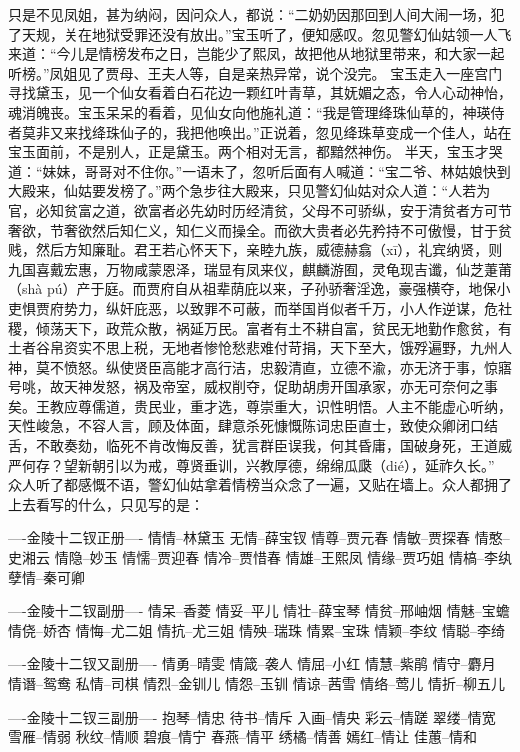 \documentclass[12pt,oneside]{book}
\begin{document}
只是不见凤姐，甚为纳闷，因问众人，都说：“二奶奶因那回到人间大闹一场，犯了天规，关在地狱受罪还没有放出。”宝玉听了，便知感叹。忽见警幻仙姑领一人飞来道：“今儿是情榜发布之日，岂能少了熙凤，故把他从地狱里带来，和大家一起听榜。”凤姐见了贾母、王夫人等，自是亲热异常，说个没完。
宝玉走入一座宫门寻找黛玉，见一个仙女看着白石花边一颗红叶青草，其妩媚之态，令人心动神怡，魂消魄丧。宝玉呆呆的看着，见仙女向他施礼道：“我是管理绛珠仙草的，神瑛侍者莫非又来找绛珠仙子的，我把他唤出。”正说着，忽见绛珠草变成一个佳人，站在宝玉面前，不是别人，正是黛玉。两个相对无言，都黯然神伤。
半天，宝玉才哭道：“妹妹，哥哥对不住你。”一语未了，忽听后面有人喊道：“宝二爷、林姑娘快到大殿来，仙姑要发榜了。”两个急步往大殿来，只见警幻仙姑对众人道：“人若为官，必知贫富之道，欲富者必先幼时历经清贫，父母不可骄纵，安于清贫者方可节奢欲，节奢欲然后知仁义，知仁义而操全。而欲大贵者必先矜持不可傲慢，甘于贫贱，然后方知廉耻。君王若心怀天下，亲睦九族，威德赫翕（xī），礼宾纳贤，则九国喜戴宏惠，万物咸蒙恩泽，瑞显有凤来仪，麒麟游囿，灵龟现吉谶，仙芝萐莆（shà pú）产于庭。而贾府自从祖辈荫庇以来，子孙骄奢淫逸，豪强横夺，地保小吏惧贾府势力，纵奸庇恶，以致罪不可蔽，而举国肖似者千万，小人作逆谋，危社稷，倾荡天下，政荒众散，祸延万民。富者有土不耕自富，贫民无地勤作愈贫，有土者谷帛资实不思上税，无地者惨怆愁悲难付苛捐，天下至大，饿殍遍野，九州人神，莫不愤怒。纵使贤臣高能才高行洁，忠毅清直，立德不渝，亦无济于事，惊寤号咷，故天神发怒，祸及帝室，威权削夺，促助胡虏开国承家，亦无可奈何之事矣。王教应尊儒道，贵民业，重才选，尊崇重大，识性明悟。人主不能虚心听纳，天性峻急，不容人言，顾及体面，肆意杀死慷慨陈词忠臣直士，致使众卿闭口结舌，不敢奏劾，临死不肯改悔反善，犹言群臣误我，何其昏庸，国破身死，王道威严何存？望新朝引以为戒，尊贤垂训，兴教厚德，绵绵瓜瓞（dié），延祚久长。”
众人听了都感慨不语，警幻仙姑拿着情榜当众念了一遍，又贴在墙上。众人都拥了上去看写的什么，只见写的是：

----金陵十二钗正册----
情情--林黛玉 无情--薛宝钗 情尊--贾元春 情敏--贾探春 情憨--史湘云 情隐--妙玉 
情懦--贾迎春 情冷--贾惜春 情雄--王熙凤 情缘--贾巧姐 情槁--李纨 孽情--秦可卿

----金陵十二钗副册----
情呆--香菱 情妥--平儿 情壮--薛宝琴 情贫--邢岫烟 情魅--宝蟾 情侥--娇杏
情悔--尤二姐 情抗--尤三姐 情殃--瑞珠 情累--宝珠 情颖--李纹 情聪--李绮 

----金陵十二钗又副册----
情勇--晴雯 情箴--袭人 情屈--小红 情慧--紫鹃 情守--麝月 情谮--鸳鸯
私情--司棋 情烈--金钏儿 情怨--玉钏 情谅--茜雪 情络--莺儿 情折--柳五儿

----金陵十二钗三副册----
抱琴--情忠 待书--情斥 入画--情央 彩云--情蹉 翠缕--情宽 雪雁--情弱
秋纹--情顺 碧痕--情宁 春燕--情平 绣橘--情善 嫣红--情让 佳蕙--情和
\end{document}
